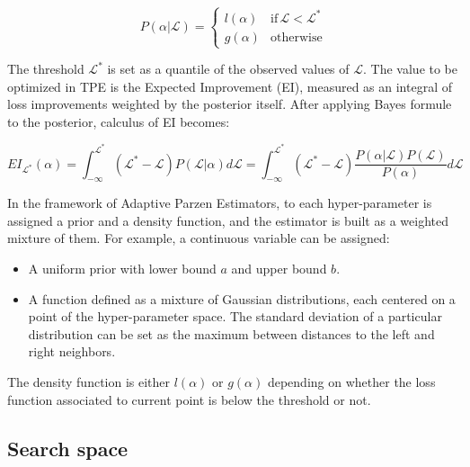   \begin{equation}
    P(\alpha \vert \mathcal L) =
      \begin{cases}
        l(\alpha) &  \text{if} \, \mathcal L < \mathcal L^* \\
        g(\alpha) &  \text{otherwise}
      \end{cases}
  \end{equation}

  The threshold $\mathcal L^*$ is set as a quantile of the observed values of $\mathcal L$.
  The value to be optimized in TPE is the Expected Improvement (EI), measured as an integral
  of loss improvements weighted by the posterior itself.
  After applying Bayes formule to the posterior, calculus of EI becomes:

  \begin{equation}
    EI_{\mathcal L^*}(\alpha) = \int_{-\infty}^{\mathcal L^*} (\mathcal L^* - \mathcal L) P(\mathcal L \vert \alpha) d\mathcal L
    = \int_{-\infty}^{\mathcal L^*} (\mathcal L^* - \mathcal L) \frac{P(\alpha \vert \mathcal L) P(\mathcal L)}{P(\alpha)} d\mathcal L
  \end{equation}

  In the framework of Adaptive Parzen Estimators, to each hyper-parameter is assigned a prior and a density function,
  and the estimator is built as a weighted mixture of them.
  For example, a continuous variable can be assigned:
  \begin{itemize}
    \item A uniform prior with lower bound $a$ and upper bound $b$.
    \item A function defined as a mixture of Gaussian distributions, each centered on a point of the hyper-parameter
    space. The standard deviation of a particular distribution can be set as the maximum between distances to the left and right
    neighbors.
  \end{itemize}

  The density function is either $l(\alpha)$ or $g(\alpha)$ depending on whether the loss function associated to current
  point is below the threshold or not.

\subsection{Search space}

